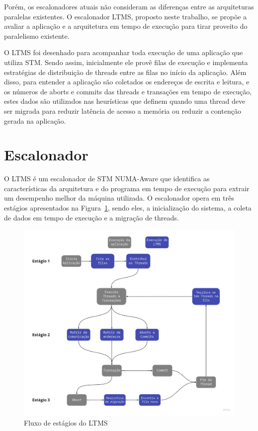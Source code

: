 \documentclass[diss,capa]{texufpel}
\begin{document}
Porém, os escalonadores atuais não consideram as diferenças entre as arquiteturas paralelas existentes. O escalonador LTMS, proposto neste trabalho, se propõe a avaliar a aplicação e a arquitetura em tempo de execução para tirar proveito do paralelismo existente.

O LTMS foi desenhado para acompanhar toda execução de uma aplicação que utiliza STM. Sendo assim, inicialmente ele provê filas de execução e implementa estratégias de distribuição de threads entre as filas no início da aplicação. Além disso, para entender a aplicação são coletados os endereços de escrita e leitura, e os números de aborts e commits das threads e transações em tempo de execução, estes dados são utilizados nas heurísticas que definem quando uma thread deve ser migrada para reduzir latência de acesso a memória ou reduzir a contenção gerada na aplicação.

\section{Escalonador}

O LTMS é um escalonador de STM NUMA-Aware que identifica as características da arquitetura e do programa em tempo de execução para extrair um desempenho melhor da máquina utilizada. O escalonador opera em três estágios apresentados na Figura~\ref{ltms_estagios}, sendo eles, a inicialização do sistema, a coleta de dados em tempo de execução e a migração de threads.

\begin{figure}[htbp]
\centering \includegraphics[scale=.3]{images/LTMS1}
\caption{Fluxo de estágios do LTMS}
\label{ltms_estagios}
\end{figure}
\end{document}
